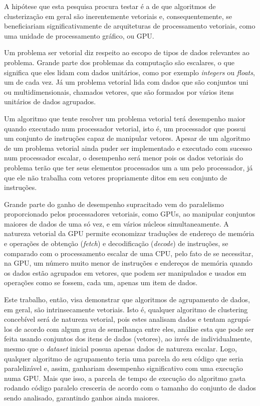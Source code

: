 \documentclass[12pt,
openright, 
oneside, %
a4paper,    %
brazil]{facom-ufu-abntex2}
\begin{document}
A hipótese que esta pesquisa procura testar é a de que algoritmos de clusterização em geral são inerentemente vetoriais e, consequentemente, se beneficiariam significativamente de arquiteturas de processamento vetoriais, como uma unidade de processamento gráfico, ou GPU.

Um problema ser vetorial diz respeito ao escopo de tipos de dados relevantes ao problema. Grande parte dos problemas da computação são escalares, o que significa que eles lidam com dados unitários, como por exemplo \textit{integers} ou \textit{floats}, um de cada vez. Já um problema vetorial lida com dados que são conjuntos uni ou multidimensionais, chamados vetores, que são formados por vários itens unitários de dados agrupados.

Um algoritmo que tente resolver um problema vetorial terá desempenho maior quando executado num processador vetorial, isto é, um processador que possui um conjunto de instruções capaz de manipular vetores. Apesar de um algoritmo de um problema vetorial ainda puder ser implementado e executado com sucesso num processador escalar, o desempenho será menor pois os dados vetoriais do problema terão que ter seus elementos processados um a um pelo processador, já que ele não trabalha com vetores propriamente ditos em seu conjunto de instruções.

Grande parte do ganho de desempenho supracitado vem do paralelismo proporcionado pelos processadores vetoriais, como GPUs, ao manipular conjuntos maiores de dados de uma só vez, e em vários núcleos simultaneamente. A natureza vetorial da GPU permite economizar traduções de endereço de memória e operações de obtenção (\textit{fetch}) e decodificação (\textit{decode}) de instruções, se comparado com o processamento escalar de uma CPU, pelo fato de se necessitar, na GPU, um número muito menor de instruções e endereços de memória quando os dados estão agrupados em vetores, que podem ser manipulados e usados em operações como se fossem, cada um, apenas um item de dados.

Este trabalho, então, visa demonstrar que algoritmos de agrupamento de dados, em geral, são intrinsecamente vetoriais. Isto é, qualquer algoritmo de clustering concebível será de natureza vetorial, pois estes analisam dados e tentam agrupá-los de acordo com algum grau de semelhança entre eles, análise esta que pode ser feita usando conjuntos dos itens de dados (vetores), ao invés de individualmente, mesmo que o \textit{dataset} inicial possua apenas dados de natureza escalar. Logo, qualquer algoritmo de agrupamento teria uma parcela do seu código que seria paralelizável e, assim, ganhariam desempenho significativo com uma execução numa GPU. Mais que isso, a parcela de tempo de execução do algoritmo gasta rodando código paralelo cresceria de acordo com o tamanho do conjunto de dados sendo analisado, garantindo ganhos ainda maiores.
\end{document}
